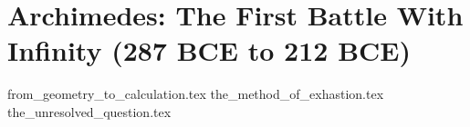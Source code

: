 \section{Archimedes: The First Battle With Infinity (287 BCE to 212 BCE)}  


{from_geometry_to_calculation.tex}
{the_method_of_exhastion.tex}
{the_unresolved_question.tex}

